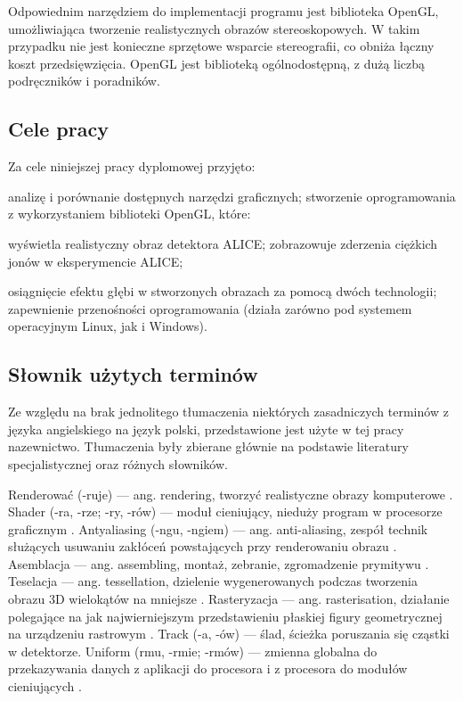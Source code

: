 Odpowiednim narzędziem do implementacji programu jest biblioteka OpenGL, umożliwiająca tworzenie realistycznych obrazów stereoskopowych. W takim przypadku nie jest konieczne sprzętowe wsparcie stereografii, co obniża łączny koszt przedsięwzięcia. OpenGL jest biblioteką ogólnodostępną, z dużą liczbą podręczników i poradników.  

\subsection{Cele pracy}
Za cele niniejszej pracy dyplomowej przyjęto:
\begin{itemize}
\itemi analizę i porównanie dostępnych narzędzi graficznych;
\itemi stworzenie oprogramowania z wykorzystaniem biblioteki OpenGL, które:
\begin{itemize}
\itemii wyświetla realistyczny obraz detektora ALICE;
\itemii zobrazowuje zderzenia ciężkich jonów w eksperymencie ALICE;
\end{itemize}
\itemi osiągnięcie efektu głębi w stworzonych obrazach za pomocą dwóch technologii;
\itemi zapewnienie przenośności oprogramowania (działa zarówno pod systemem operacyjnym Linux, jak i Windows).
\end{itemize}

\subsection{Słownik użytych terminów}
Ze względu na brak jednolitego tłumaczenia niektórych zasadniczych terminów z języka angielskiego na język polski, przedstawione jest użyte w tej pracy nazewnictwo. Tłumaczenia były zbierane głównie na podstawie literatury specjalistycznej oraz różnych słowników.
\begin{itemize}
\itemi Renderować (-ruje) --- ang. rendering, tworzyć realistyczne obrazy komputerowe \cite{pwn}.
\itemi Shader (-ra, -rze; -ry, -rów) --- moduł cieniujący, nieduży program w procesorze graficznym \cite{slownik}.
\itemi Antyaliasing (-ngu, -ngiem) --- ang. anti-aliasing, zespół technik służących usuwaniu zakłóceń powstających przy renderowaniu obrazu \cite{wprowadzeniedografiki}.
\itemi Asemblacja --- ang. assembling, montaż, zebranie, zgromadzenie prymitywu \cite{slownik}.
\itemi Teselacja --- ang. tessellation, dzielenie wygenerowanych podczas tworzenia obrazu 3D wielokątów na mniejsze \cite{slownik}.
\itemi Rasteryzacja --- ang. rasterisation, działanie polegające na jak najwierniejszym przedstawieniu płaskiej figury geometrycznej na urządzeniu rastrowym \cite{slownik}.
\itemi Track (-a, -ów) --- ślad, ścieżka poruszania się cząstki w detektorze.
\itemi Uniform (rmu, -rmie; -rmów) --- zmienna globalna do przekazywania danych z aplikacji do procesora i z procesora do modułów cieniujących \cite{slownik}.
\end{itemize}

